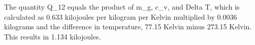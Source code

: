 The quantity Q_12 equals the product of m_g, c_v, and Delta T, which is calculated as 0.633 kilojoules per kilogram per Kelvin multiplied by 0.0036 kilograms and the difference in temperature, 77.15 Kelvin minus 273.15 Kelvin. This results in 1.134 kilojoules.